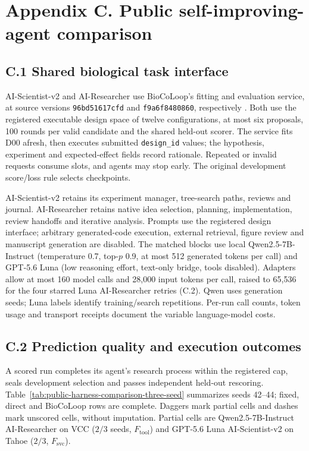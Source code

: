 \clearpage
\section*{Appendix C. Public self-improving-agent comparison}
\label{app:public-harness-comparison}
\setcounter{table}{0}
\renewcommand{\thetable}{C.\arabic{table}}
\renewcommand{\theHtable}{C.\arabic{table}}

\subsection*{C.1 Shared biological task interface}
AI-Scientist-v2 \citep{Yamada2025AIScientistV2} and AI-Researcher \citep{Tang2025AIResearcher} use BioCoLoop's fitting and evaluation service, at source versions \texttt{96bd51617cfd} and \texttt{f9a6f8480860}, respectively \citep{AIScientistV2Code,AIResearcherCode}. Both use the registered executable design space of twelve configurations, at most six proposals, 100 rounds per valid candidate and the shared held-out scorer. The service fits D00 afresh, then executes submitted \texttt{design\_id} values; the hypothesis, experiment and expected-effect fields record rationale. Repeated or invalid requests consume slots, and agents may stop early. The original development score/loss rule selects checkpoints.

AI-Scientist-v2 retains its experiment manager, tree-search paths, reviews and journal. AI-Researcher retains native idea selection, planning, implementation, review handoffs and iterative analysis. Prompts use the registered design interface; arbitrary generated-code execution, external retrieval, figure review and manuscript generation are disabled. The matched blocks use local Qwen2.5-7B-Instruct (temperature 0.7, top-$p$ 0.9, at most 512 generated tokens per call) and GPT-5.6 Luna (low reasoning effort, text-only bridge, tools disabled). Adapters allow at most 160 model calls and 28,000 input tokens per call, raised to 65,536 for the four starred Luna AI-Researcher retries (C.2). Qwen uses generation seeds; Luna labels identify training/search repetitions. Per-run call counts, token usage and transport receipts document the variable language-model costs.

\subsection*{C.2 Prediction quality and execution outcomes}
A scored run completes its agent's research process within the registered cap, seals development selection and passes independent held-out rescoring. Table~\ref{tab:public-harness-comparison-three-seed} summarizes seeds 42--44; fixed, direct and BioCoLoop rows are complete. Daggers mark partial cells and dashes mark unscored cells, without imputation. Partial cells are Qwen2.5-7B-Instruct AI-Researcher on VCC ($2/3$ seeds, $F_{\mathrm{tool}}$) and GPT-5.6 Luna AI-Scientist-v2 on Tahoe ($2/3$, $F_{\mathrm{svc}}$).

